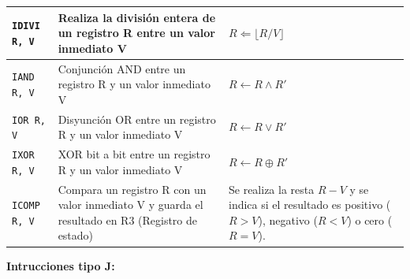 \documentclass{article}
\begin{document}
\begin{longtable}{|p{}|p{}|p{}|}
  \hline
  \texttt{IDIVI R, V}         & Realiza la división entera de un registro R entre un valor inmediato V                          & $R \Leftarrow \lfloor R / V \rfloor $                                                                               \\
  \hline
  \texttt{IAND R, V}          & Conjunción AND entre un registro R y un valor inmediato V                                       & $ R \leftarrow R \wedge R'$                                                                                         \\
  \hline
  \texttt{IOR R, V}           & Disyunción OR entre un registro R y un valor inmediato V                                        & $R \leftarrow R \vee R'$                                                                                            \\
  \hline
  \texttt{IXOR R, V}          & XOR bit a bit entre un registro R y un valor inmediato V                                        & $R \leftarrow R \oplus R'$                                                                                          \\
  \hline
  \texttt{ICOMP R, V}         & Compara un registro R con un valor inmediato V y guarda el resultado en R3 (Registro de estado) & Se realiza la resta $R - V$ y se indica si el resultado es positivo ($R > V$), negativo ($R < V$) o cero ($R = V$). \\
  \hline
\end{longtable}

\textbf{Intrucciones tipo J:}
\end{document}

